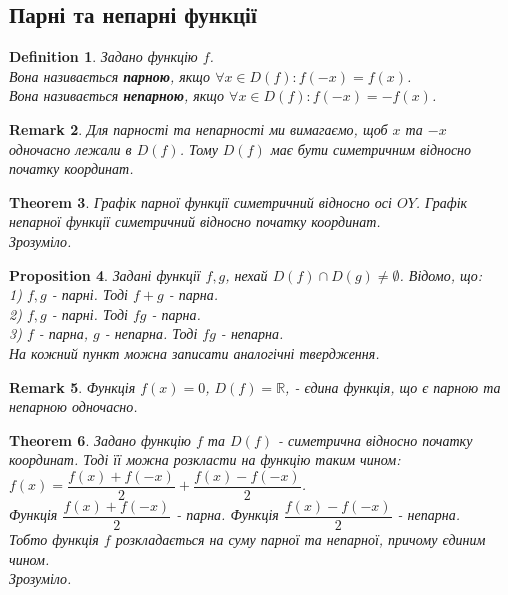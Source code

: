 \documentclass[a4paper, 10pt]{article}
\theoremstyle{theoremdd}
\newtheorem{theorem}{Theorem}[subsection]
\theoremstyle{theoremdd}
\newtheorem{definition}[theorem]{Definition}
\theoremstyle{theoremdd}
\theoremstyle{theoremdd}
\theoremstyle{theoremdd}
\newtheorem{proposition}[theorem]{Proposition}
\theoremstyle{theoremdd}
\newtheorem{remark}[theorem]{Remark}
\theoremstyle{theoremdd}
\theoremstyle{theoremdd}
\begin{document}
\subsection{Парні та непарні функції}
\begin{definition}
Задано функцію $f$.\\
Вона називається \textbf{парною}, якщо $\forall x \in D(f): f(-x)=f(x)$.\\
Вона називається \textbf{непарною}, якщо $\forall x \in D(f): f(-x)=-f(x)$.
\end{definition}

\begin{remark}
Для парності та непарності ми вимагаємо, щоб $x$ та $-x$ одночасно лежали в $D(f)$. Тому $D(f)$ має бути симетричним відносно початку координат.
\end{remark}

\begin{theorem}
Графік парної функції симетричний відносно осі $OY$. Графік непарної функції симетричний відносно початку координат.\\
\textit{Зрозуміло.}
\end{theorem}

\begin{proposition}
Задані функції $f,g$, нехай $D(f) \cap D(g) \neq \emptyset$. Відомо, що:\\
1) $f,g$ - парні. Тоді $f+g$ - парна.\\
2) $f,g$ - парні. Тоді $fg$ - парна.\\
3) $f$ - парна, $g$ - непарна. Тоді $fg$ - непарна.\\
\textit{На кожний пункт можна записати аналогічні твердження.}
\end{proposition}

\begin{remark}
Функція $f(x) = 0$, $D(f) = \mathbb{R}$, - єдина функція, що є парною та непарною одночасно.
\end{remark}

\begin{theorem}
Задано функцію $f$ та $D(f)$ - симетрична відносно початку координат. Тоді її можна розкласти на функцію таким чином:\\
$f(x) = \dfrac{f(x) + f(-x)}{2} + \dfrac{f(x)-f(-x)}{2}$.\\
Функція $\dfrac{f(x)+f(-x)}{2}$ - парна. Функція $\dfrac{f(x)-f(-x)}{2}$ - непарна.\\
Тобто функція $f$ розкладається на суму парної та непарної, причому єдиним чином.\\
\textit{Зрозуміло.}
\end{theorem}
\end{document}

